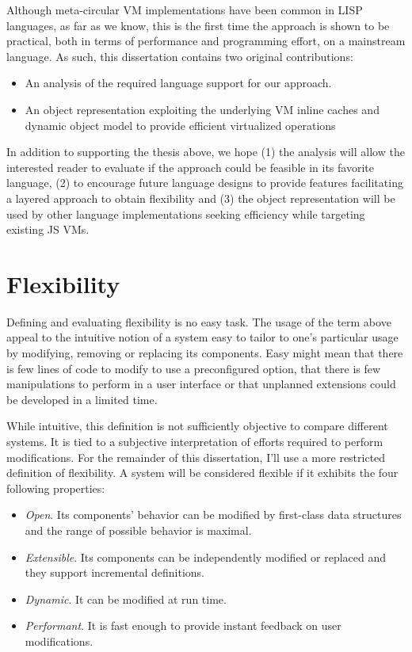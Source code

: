 Although meta-circular VM implementations have been common in LISP languages,
as far as we know, this is the first time the approach is shown to be practical,
both in terms of performance and programming effort, on a mainstream language.
As such, this dissertation contains two original contributions:
\begin{itemize}
    \item An analysis of the required language support for our approach.
    \item An object representation exploiting the underlying VM inline caches
        and dynamic object model to provide efficient virtualized operations
\end{itemize}

In addition to supporting the thesis above, we hope (1) the analysis will allow
the interested reader to evaluate if the approach could be feasible in its
favorite language, (2) to encourage future language designs to provide features
facilitating a layered approach to obtain flexibility and (3) the object
representation will be used by other language implementations seeking
efficiency while targeting existing JS VMs.

\section{Flexibility}

Defining and evaluating flexibility is no easy task. The usage of the term
above appeal to the intuitive notion of a system easy to tailor to one's
particular usage by modifying, removing or replacing its components. Easy might
mean that there is few lines of code to modify to use a preconfigured option,
that there is few manipulations to perform in a user interface or that unplanned
extensions could be developed in a limited time.

While intuitive, this definition is not sufficiently objective to compare
different systems. It is tied to a subjective interpretation of efforts required to
perform modifications. For the remainder of this dissertation, I'll use a more
restricted definition of flexibility. A system will be considered flexible if
it exhibits the four following properties:

\begin{itemize}
    \item \textit{Open}. Its components' behavior can be modified by
        first-class data structures and the range of possible behavior is
        maximal. 

    \item \textit{Extensible}. Its components can be independently modified or
        replaced and they support incremental definitions. 

    \item \textit{Dynamic}. It can be modified at run time.

    \item \textit{Performant}. It is fast enough to provide instant feedback on
        user modifications.
\end{itemize}

